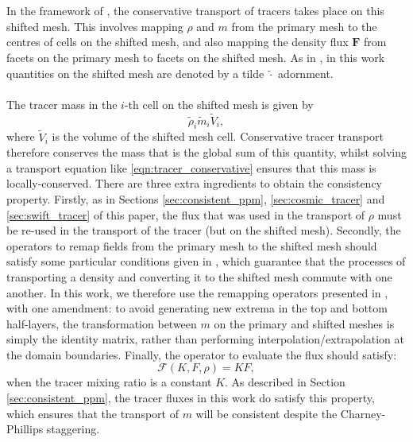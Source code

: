 \documentclass[11pt,a4paper]{article}
\begin{document}
\\
\\
In the framework of \citet{bendall2023solution}, the conservative transport of tracers takes place on this shifted mesh.
This involves mapping $\rho$ and $m$ from the primary mesh to the centres of cells on the shifted mesh, and also mapping the density flux $\bm{F}$ from facets on the primary mesh to facets on the shifted mesh.
As in \citet{bendall2023solution}, in this work quantities on the shifted mesh are denoted by a tilde $\widetilde{\cdot}$ adornment. \\
\\
The tracer mass in the $i$-th cell on the shifted mesh is given by
\begin{equation}
\widetilde{\rho}_i\widetilde{m}_i \widetilde{V}_i,
\end{equation}
where $\widetilde{V}_i$ is the volume of the shifted mesh cell.
Conservative tracer transport therefore conserves the mass that is the global sum of this quantity, whilst solving a transport equation like \eqref{eqn:tracer_conservative} ensures that this mass is locally-conserved.
There are three extra ingredients to obtain the consistency property.
Firstly, as in Sections \ref{sec:consistent_ppm}, \ref{sec:cosmic_tracer} and \ref{sec:swift_tracer} of this paper, the flux that was used in the transport of $\rho$ must be re-used in the transport of the tracer (but on the shifted mesh).
Secondly, the operators to remap fields from the primary mesh to the shifted mesh should satisfy some particular conditions given in \citet{bendall2023solution}, which guarantee that the processes of transporting a density and converting it to the shifted mesh commute with one another.
In this work, we therefore use the remapping operators presented in \citet{bendall2023solution}, with one amendment: to avoid generating new extrema in the top and bottom half-layers, the transformation between $m$ on the primary and shifted meshes is simply the identity matrix, rather than performing interpolation/extrapolation at the domain boundaries.
Finally, the operator to evaluate the flux should satisfy:
\begin{equation}
\mathcal{F}(K,F,\rho) = KF,
\end{equation}
when the tracer mixing ratio is a constant $K$.
As described in Section \ref{sec:consistent_ppm}, the tracer fluxes in this work do satisfy this property, which ensures that the transport of $m$ will be consistent despite the Charney-Phillips staggering.
\end{document}
